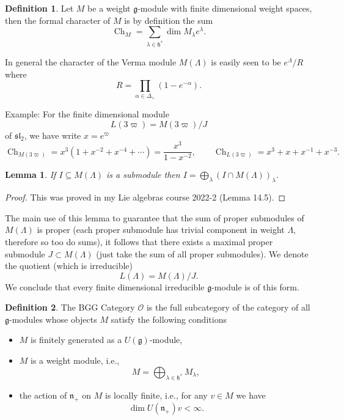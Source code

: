 \documentclass[12pt]{article}
\theoremstyle{plain}
\newtheorem{lemma}[thm]{Lemma}
\theoremstyle{definition}
\newtheorem{defn}{Definition}[section]
\numberwithin{equation}{section}
\DeclareMathOperator{\ch}{Ch}
\newcommand{\al}{\alpha}
\newcommand{\la}{\lambda}
\newcommand{\La}{\Lambda}
\newcommand{\D}{\Delta}
\newcommand{\g}{\mathfrak{g}}
\newcommand{\h}{\mathfrak{h}}
\newcommand{\n}{\mathfrak{n}}
\newcommand{\sll}{\mathfrak{sl}}
\newcommand{\OO}{\mathcal{O}}
\begin{document}
\begin{defn}
Let $M$ be a weight $\g$-module with finite dimensional weight spaces, then the formal character of $M$ is by definition the sum
\[
\ch_M = \sum_{\lambda \in \h^*} \dim M_\la e^\la.
\]
\end{defn}

In general the character of the Verma module $M(\La)$ is easily seen to be $e^\La / R$ where
\[
R = \prod_{\al \in \D_+} (1 - e^{-\al}).
\]

Example: For the finite dimensional module
\[
L(3\varpi) = M(3\varpi) / J
\]
of $\sll_2$, we have write $x = e^\varpi$
\[
\ch_{M(3\varpi)} = x^3(1 + x^{-2} + x^{-4} + \cdots) = \frac{x^3}{1-x^{-2}}, \qquad \ch_{L(3\varpi)} = x^3 + x + x^{-1} + x^{-3}.
\]



\begin{lemma}
If $I \subseteq M(\La)$ is a submodule then $I = \bigoplus_\la (I \cap M(\La))_\la$.
\end{lemma}

\begin{proof}
This was proved in my Lie algebras course 2022-2 (Lemma 14.5).
\end{proof}

The main use of this lemma to guarantee that the sum of proper submodules of $M(\Lambda)$ is proper (each proper submodule has trivial component in weight $\Lambda$, therefore so too do sums), it follows that there exists a maximal proper submodule $J \subset M(\Lambda)$ (just take the sum of all proper submodules). We denote the quotient (which is irreducible)
\[
L(\La) = M(\La) / J.
\]
We conclude that every finite dimensional irreducible $\g$-module is of this form.

\begin{defn}
The BGG Category $\OO$ is the full subcategory of the category of all $\g$-modules whose objects $M$ satisfy the following conditions
\begin{itemize}
\item $M$ is finitely generated as a $U(\g)$-module,

\item $M$ is a weight module, i.e.,
\[
M = \bigoplus_{\la \in \h^*} M_\la,
\]

\item the action of $\n_+$ on $M$ is locally finite, i.e., for any $v \in M$ we have
\[
\dim U(\n_+) v < \infty.
\]
\end{itemize}
\end{defn}
\end{document}

